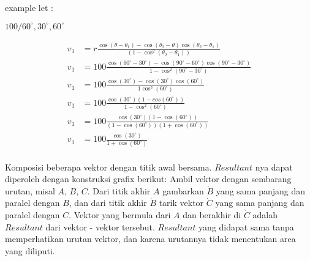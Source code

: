 \documentclass{article}
\begin{document}
example let :

$100/60^\circ, 30^\circ, 60^\circ$


\begin{align*}
v_1 &= r\frac{\cos(\theta - \theta_1) - \cos(\theta_2 - \theta)\cos(\theta_2 - \theta_1) }{(1 - \cos^2(\theta_2 - \theta_1))}\\
v_1 &= 100\frac{\cos(60^\circ-30^\circ) - \cos(90^\circ - 60^\circ)\cos(90^\circ - 30^\circ)}{1 - \cos^2(90^\circ - 30^\circ)}\\
v_1 &= 100\frac{\cos(30^\circ) - \cos(30^\circ)\cos(60^\circ)}{1 \cos^2(60^\circ)}\\
v_1 &= 100\frac{\cos(30^\circ)(1-cos(60^\circ))}{1-\cos^2(60^\circ)}\\
v_1 &= 100\frac{\cos(30^\circ)(1-\cos(60^\circ))}{(1-\cos(60^\circ))(1+\cos(60^\circ))}\\
v_1 &= 100\frac{\cos(30^\circ)}{1+\cos(60^\circ)}\\
\end{align*}

Komposisi beberapa vektor dengan titik awal bersama. $Resultant$ nya dapat 
diperoleh dengan konstruksi grafix berikut: Ambil vektor dengan sembarang 
urutan, misal $A$, $B$, $C$. Dari titik akhir $A$ gambarkan $\grave{B}$ yang 
sama panjang dan paralel dengan $B$, dan dari titik akhir $\grave{B}$ tarik 
vektor $\grave{C}$ yang sama panjang dan paralel dengan $C$. Vektor yang 
bermula dari $A$ dan berakhir di $\grave{C}$ adalah $Resultant$ dari 
vektor - vektor tersebut. $Resultant$ yang didapat sama tanpa memperhatikan 
urutan vektor, dan karena urutannya tidak menentukan area yang diliputi.
\end{document}
